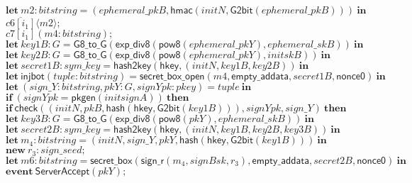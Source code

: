 \documentclass{article}
\newcommand{\cinput}[2]{{#1}({#2})}
\newcommand{\coutput}[2]{\overline{#1}\langle{#2}\rangle}
\newcommand{\kw}[1]{\mathbf{#1}}
\newcommand{\kwf}[1]{\mathsf{#1}}
\newcommand{\var}[1]{\mathit{#1}}
\newcommand{\kwt}[1]{\mathit{#1}}
\newcommand{\kwc}[1]{\mathit{#1}}
\begin{document}
\begin{tabbing}
\>$\quad \kw{let}\ \var{m2}: \kwt{bitstring} = \kwf{}(\var{ephemeral{\_}pkB}, \kwf{hmac}(\var{initN}, \kwf{G2bit}(\var{ephemeral{\_}pkB})))\ \kw{in}$\\
\>$\quad \coutput{\kwc{c6}[\var{i}_{1}]}{\var{m2}};$\\
\>$\quad \cinput{\kwc{c7}[\var{i}_{1}]}{\var{m4}: \kwt{bitstring}};$\\
\>$\quad \kw{let}\ \var{key1B}: \kwt{G} = \kwf{G8{\_}to{\_}G}(\kwf{exp{\_}div8}(\kwf{pow8}(\var{ephemeral{\_}pkY}), \var{ephemeral{\_}skB}))\ \kw{in}$\\
\>$\quad \kw{let}\ \var{key2B}: \kwt{G} = \kwf{G8{\_}to{\_}G}(\kwf{exp{\_}div8}(\kwf{pow8}(\var{ephemeral{\_}pkY}), \var{initskB}))\ \kw{in}$\\
\>$\quad \kw{let}\ \var{secret1B}: \kwt{sym{\_}key} = \kwf{hash2key}(\kwf{hkey}, \kwf{}(\var{initN}, \var{key1B}, \var{key2B}))\ \kw{in}$\\
\>$\quad \kw{let}\ \kwf{injbot}(\var{tuple}: \kwt{bitstring}) = \kwf{secret{\_}box{\_}open}(\var{m4}, \kwf{empty{\_}addata}, \var{secret1B}, \kwf{nonce0})\ \kw{in}$\\
\>$\quad \kw{let}\ \kwf{}(\var{sign{\_}Y}: \kwt{bitstring}, \var{pkY}: \kwt{G}, \var{signYpk}: \kwt{pkey}) = \var{tuple}\ \kw{in}$\\
\>$\quad \kw{if}\ (\var{signYpk}  =  \kwf{pkgen}(\var{initsignA}))\ \kw{then}$\\
\>$\quad \kw{if}\ \kwf{check}(\kwf{}(\var{initN}, \var{pkB}, \kwf{hash}(\kwf{hkey}, \kwf{G2bit}(\var{key1B}))), \var{signYpk}, \var{sign{\_}Y})\ \kw{then}$\\
\>$\quad \kw{let}\ \var{key3B}: \kwt{G} = \kwf{G8{\_}to{\_}G}(\kwf{exp{\_}div8}(\kwf{pow8}(\var{pkY}), \var{ephemeral{\_}skB}))\ \kw{in}$\\
\>$\quad \kw{let}\ \var{secret2B}: \kwt{sym{\_}key} = \kwf{hash2key}(\kwf{hkey}, \kwf{}(\var{initN}, \var{key1B}, \var{key2B}, \var{key3B}))\ \kw{in}$\\
\>$\quad \kw{let}\ \var{m}_{4}: \kwt{bitstring} = \kwf{}(\var{initN}, \var{sign{\_}Y}, \var{pkY}, \kwf{hash}(\kwf{hkey}, \kwf{G2bit}(\var{key1B})))\ \kw{in}$\\
\>$\quad \kw{new}\ \var{r}_{3}: \kwt{sign{\_}seed};$\\
\>$\quad \kw{let}\ \var{m6}: \kwt{bitstring} = \kwf{secret{\_}box}(\kwf{sign{\_}r}(\var{m}_{4}, \var{signBsk}, \var{r}_{3}), \kwf{empty{\_}addata}, \var{secret2B}, \kwf{nonce0})\ \kw{in}$\\
\>$\quad \kw{event}\ \kwf{ServerAccept}(\var{pkY});$\\

\end{tabbing}
\end{document}
